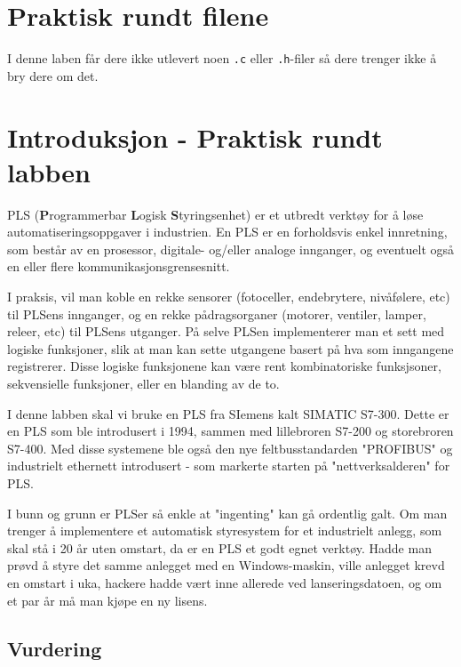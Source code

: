 \begin{alphasection}
\section{Praktisk rundt filene}

I denne laben får dere ikke utlevert noen \verb|.c| eller \verb|.h|-filer så dere trenger ikke å bry dere om det.



\section{Introduksjon - Praktisk rundt labben}
PLS (\textbf{P}rogrammerbar \textbf{L}ogisk \textbf{S}tyringsenhet) er et utbredt verktøy for å løse automatiseringsoppgaver i industrien. En PLS er en forholdsvis enkel innretning, som består av en prosessor, digitale- og/eller analoge innganger, og eventuelt også en eller flere kommunikasjonsgrensesnitt.

I praksis, vil man koble en rekke sensorer (fotoceller, endebrytere, nivåfølere, etc) til PLSens innganger, og en rekke pådragsorganer (motorer, ventiler, lamper, releer, etc) til PLSens utganger. På selve PLSen implementerer man et sett med logiske funksjoner, slik at man kan sette utgangene basert på hva som inngangene registrerer. Disse logiske funksjonene kan være rent kombinatoriske funksjsoner, sekvensielle funksjoner, eller en blanding av de to.

I denne labben skal vi bruke en PLS fra SIemens kalt SIMATIC S7-300. Dette er en PLS som ble introdusert i 1994, sammen med lillebroren S7-200 og storebroren S7-400. Med disse systemene ble også den nye feltbusstandarden "PROFIBUS" og industrielt ethernett introdusert - som markerte starten på "nettverksalderen" for PLS. 


I bunn og grunn er PLSer så enkle at "ingenting" kan gå ordentlig galt. Om man trenger å implementere et automatisk styresystem for et industrielt anlegg, som skal stå i 20 år uten omstart, da er en PLS et godt egnet verktøy. Hadde man prøvd å styre det samme anlegget med en Windows-maskin, ville anlegget krevd en omstart i uka, hackere hadde vært inne allerede ved lanseringsdatoen, og om et par år må man kjøpe en ny lisens.

\subsection*{Vurdering}




\end{alphasection}
